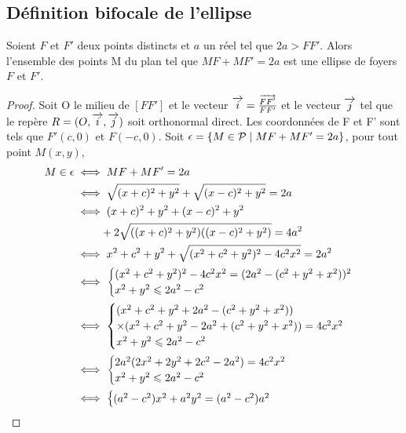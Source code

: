 \subsection{Définition bifocale de l'ellipse}
\begin{prop}
  \label{prop:bifellipse}
  Soient \(F\) et \(F'\) deux points distincts et \(a\) un réel tel que 
  \(2a>FF'\). Alors l'ensemble des points M du plan tel que \(MF+MF'=2a\) est 
  une ellipse de foyers \(F\) et \(F'\).
\end{prop}
\begin{proof}
  Soit O le milieu de \([FF']\) et le vecteur \(\overrightarrow{i}=\frac{\overrightarrow{FF'}}{FF'}\) et 
  le vecteur \(\overrightarrow{j}\) tel que le repère \(R=(O,\overrightarrow{i},\overrightarrow{j})\) soit orthonormal direct. Les 
  coordonnées de F et F' sont tels que \(F'(c,0)\) et \(F(-c,0)\). Soit 
  \(\epsilon=\left\{M \in \mathcal{P}\mathrel{}\middle|\mathrel{}MF+MF'=2a\right\}\), pour tout point \(M(x,y)\),
  \begin{align}
    M \in \epsilon & \iff MF+MF'=2a \\
                   & \iff \sqrt{(x+c)^2+y^2} + \sqrt{(x-c)^2+y^2}=2a \\
                   & \iff (x+c)^2+y^2+(x-c)^2+y^2 \notag \\
                   & \phantom{\iff} + 2\sqrt{((x+c)^2+y^2)((x-c)^2+y^2)}=4a^2 
                   \label{eq:tag:1}\\
                   & \iff x^2+c^2+y^2+\sqrt{(x^2+c^2+y^2)^2-4c^2x^2}=2a^2\\
                   & \iff \begin{cases} (x^2+c^2+y^2)^2-4c^2x^2 = 
                   (2a^2-(c^2+y^2+x^2))^2 \\ x^2+y^2 \leqslant 2a^2 
                 -c^2\\\end{cases}\\
                   & \iff \begin{cases} (x^2+c^2+y^2 + 2a^2-(c^2+y^2+x^2)) \\ 
                   \times (x^2+c^2+y^2 - 2a^2+(c^2+y^2+x^2))=4c^2x^2  \\ x^2+y^2 
                 \leqslant 2a^2 -c^2\end{cases}\\
                   & \iff \begin{cases} 2a^2(2x^2+2y^2+2c^2-2a^2)=4c^2x^2  \\ 
                   x^2+y^2 \leqslant 2a^2 -c^2\end{cases}\\
                   & \iff \begin{cases} (a^2-c^2)x^2 +a^2y^2=(a^2-c^2)a^2  \\ 

\end{cases}
\end{align}
\end{proof}
